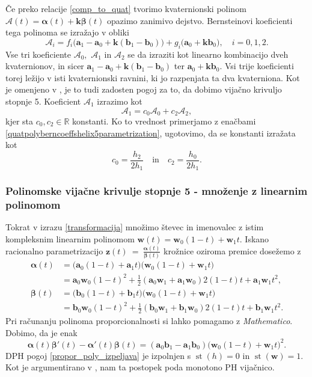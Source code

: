 \documentclass[12pt,a4paper,twoside]{article}
\theoremstyle{definition} %
\theoremstyle{plain} %
\theoremstyle{primerstyle}
\numberwithin{equation}{section}  %
\newcommand{\R}{\mathbb R}
\newcommand{\aV}{\mathbf{a}}
\newcommand{\bV}{\mathbf{b}}
\newcommand{\kV}{\mathbf{k}}
\newcommand{\wV}{\mathbf{w}}
\newcommand{\zV}{\mathbf{z}}
\newcommand{\AQ}{\mathcal{A}}
\newcommand{\balpha}{\boldsymbol \alpha}
\newcommand{\bbeta}{\boldsymbol \beta}
\DeclareMathOperator{\st}{st}
\begin{document}
Če preko relacije \eqref{comp_to_quat} tvorimo kvaternionski polinom $\AQ(t)=\balpha(t)+\kV\bbeta(t)$ opazimo zanimivo dejstvo. Bernsteinovi koeficienti tega polinoma se izražajo v obliki
\begin{equation}
	\label{quatpolyberncoeffshelix5parametrization}
	\AQ_i=f_i\big(\aV_1-\aV_0+\kV(\bV_1-\bV_0)\big)+g_i\big(\aV_0+\kV\bV_0\big),\quad i=0,1,2.
\end{equation}
Vse tri koeficiente $\AQ_0,$ $\AQ_1$ in $\AQ_2$ se da izraziti kot linearno kombinacijo dveh kvaternionov, in sicer $\aV_1-\aV_0+\kV(\bV_1-\bV_0)$ ter $\aV_0+\kV\bV_0.$ Vsi trije koeficienti torej ležijo v isti kvaternionski ravnini, ki jo razpenjata ta dva kvaterniona. Kot je omenjeno v \cite[str.\ 378]{faroukietal2004}, je to tudi zadosten pogoj za to, da dobimo vijačno krivuljo stopnje 5. Koeficient $\AQ_1$ izrazimo kot 
\begin{equation}
	\label{A1kotA0inA2}
	\AQ_1=c_0\AQ_0+c_2\AQ_2,
\end{equation}	
kjer sta $c_0,c_2\in\R$ konstanti. Ko to vrednost primerjamo z enačbami \eqref{quatpolyberncoeffshelix5parametrization}, ugotovimo, da se konstanti izražata kot
\begin{equation*}
	c_0=\frac{h_2}{2h_1}\quad\text{in}\quad c_2=\frac{h_0}{2h_1}.
\end{equation*}

\subsubsection{Polinomske vijačne krivulje stopnje 5 - množenje z linearnim polinomom}
\label{mnozenje_linearni_polinom_5}

Tokrat v izrazu \eqref{transformacija} množimo števec in imenovalec z istim kompleksnim linearnim polinomom $\wV(t)=\wV_0(1-t)+\wV_1t.$ Iskano racionalno parametrizacijo $\zV(t)~=~\frac{\balpha(t)}{\bbeta(t)}$ krožnice oziroma premice dosežemo z
\begin{align}
	\balpha(t)&=\big(\aV_0(1-t)+\aV_1t\big)\big(\wV_0(1-t)+\wV_1t\big)\nonumber\\
	&=\aV_0\wV_0(1-t)^2+\frac{1}{2}(\aV_0\wV_1+\aV_1\wV_0)2(1-t)t+\aV_1\wV_1t^2,\label{kompl_polinoma_mnozenje_lin_pol}\\
	\bbeta(t)&=\big(\bV_0(1-t)+\bV_1t\big)\big(\wV_0(1-t)+\wV_1t\big)\nonumber\\
	&=\bV_0\wV_0(1-t)^2+\frac{1}{2}(\bV_0\wV_1+\bV_1\wV_0)2(1-t)t+\bV_1\wV_1t^2.\nonumber
\end{align}
Pri računanju polinoma proporcionalnosti si lahko pomagamo z \emph{Mathematico}. Dobimo, da je enak
\begin{equation*}
	\balpha(t)\bbeta'(t)-\balpha'(t)\bbeta(t)=(\aV_0\bV_1-\aV_1\bV_0)\big(\wV_0(1-t)+\wV_1t\big)^2.
\end{equation*}
DPH pogoj \eqref{propor_poly_izpeljava} je izpolnjen s $\st(h)=0$ in $\st(\wV)=1.$ Kot je argumentirano v \cite[str.\ 118]{beltranmonterde}, nam ta postopek poda monotono PH vijačnico.
\end{document}
